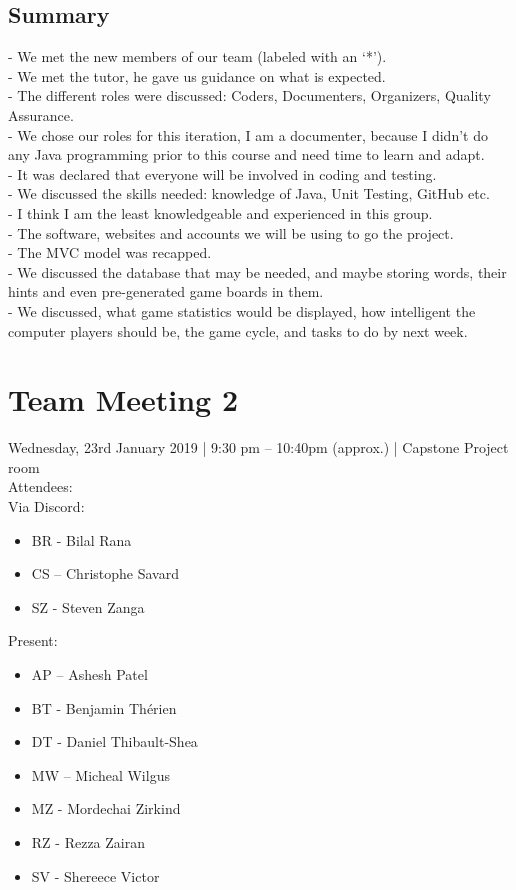 \documentclass[12pt]{article}
\begin{document}
\subsection{Summary}
-	We met the new members of our team (labeled with an ‘*’).\\
-	We met the tutor, he gave us guidance on what is expected.\\
-	The different roles were discussed: Coders, Documenters, Organizers, Quality Assurance.\\
-	We chose our roles for this iteration, I am a documenter, because I didn’t do any Java programming prior to this course and need time to learn and adapt. \\
-	It was declared that everyone will be involved in coding and testing. \\
-	We discussed the skills needed: knowledge of Java, Unit Testing, GitHub etc.\\
-	I think I am the least knowledgeable and experienced in this group. \\
-	The software, websites and accounts we will be using to go the project. \\
-	The MVC model was recapped. \\
-	We discussed the database that may be needed, and maybe storing words, their hints and even pre-generated game boards in them. \\
-	We discussed, what game statistics would be displayed, how intelligent the computer players should be, the game cycle, and tasks to do by next week. \\

 

\section{Team Meeting 2 }

Wednesday, 23rd January 2019 | 9:30 pm – 10:40pm (approx.) | Capstone Project room\\ 
Attendees: \\
Via Discord: 
\begin{itemize}
	\item BR - Bilal Rana
	\item CS – Christophe Savard 
	\item SZ - Steven Zanga
\end{itemize}

Present: 
\begin{itemize}
	\item AP – Ashesh Patel
	\item BT - Benjamin Th\'erien
	\item DT - Daniel Thibault-Shea
	\item MW – Micheal Wilgus
	\item MZ - Mordechai Zirkind  
	\item RZ - Rezza Zairan 
	\item SV - Shereece Victor 
	
\end{itemize}
\end{document}
